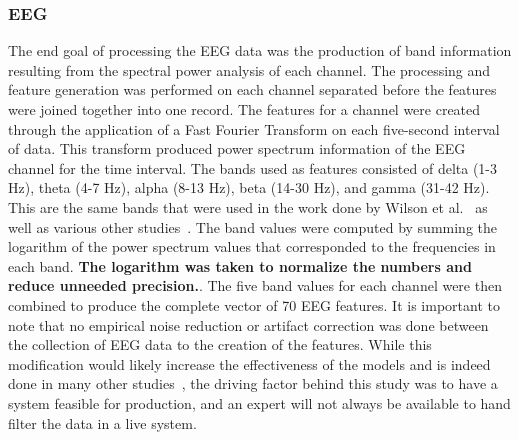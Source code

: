\documentclass[11pt]{article}
\begin{document}
		\subsubsection{EEG}
		The end goal of processing the EEG data was the production of band information resulting from the spectral power analysis of each channel.  The processing and feature generation was performed on each channel separated before the features were joined together into one record. The features for a channel were created through the application of a Fast Fourier Transform on each five-second interval of data. This transform produced power spectrum information of the EEG channel for the time interval. The bands used as features consisted of delta (1-3 Hz), theta (4-7 Hz), alpha (8-13 Hz), beta (14-30 Hz), and gamma (31-42 Hz). This are the same bands that were used in the work done by Wilson et al.~\cite{} as well as various other studies~\cite{...}. The band values were computed by summing the logarithm of the power spectrum values that corresponded to the frequencies in each band. {\bf The logarithm was taken to normalize the numbers and reduce unneeded precision.}. The five band values for each channel were then combined to produce the complete vector of 70 EEG features. It is important to note that no empirical noise reduction or artifact correction was done between the collection of EEG data to the creation of the features. While this modification would likely increase the effectiveness of the models and is indeed done in many other studies~\cite{...}, the driving factor behind this study was to have a system feasible for production, and an expert will not always be available to hand filter the data in a live system. 
			
\end{document}
